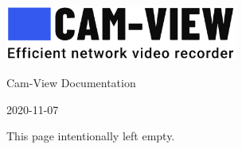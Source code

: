 \def\MyTitle{Cam-View Documentation}
\def\MyDate{2020-11-07}
\def\PRODUCT{Cam-View}


\clearpage
\pagestyle{empty}
\centerline{\includegraphics[width=3in]{cam-view-large.png}}

\vfill

\centerline{\MyTitle{}}

\vfill

\centerline{\MyDate{}}

\clearpage
\pagestyle{plain}
\setcounter{page}{1}
\tableofcontents

\clearpage
\setcounter{page}{1}








\clearpage
This page intentionally left empty.
\LastPage{}

